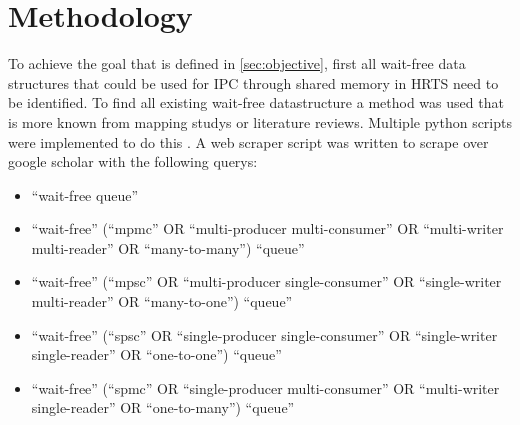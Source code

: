 \chapter{Methodology}\label{ch:methodology}
To achieve the goal that is defined in \cref{sec:objective}, first all wait-free data structures that could be used for \ac{IPC} through shared memory in \ac{HRTS} need to be identified. To find all existing wait-free datastructure a method was used that is more known from mapping studys or literature reviews. Multiple python scripts were implemented to do this \cite{githubMA}. A web scraper script was written to scrape over google scholar with the following querys:
\begin{itemize}
   \item \enquote{wait-free queue}
   \item \enquote{wait-free} (\enquote{mpmc} OR \enquote{multi-producer multi-consumer} OR \enquote{multi-writer multi-reader} OR \enquote{many-to-many}) \enquote{queue}
   \item \enquote{wait-free} (\enquote{mpsc} OR \enquote{multi-producer single-consumer} OR \enquote{single-writer multi-reader} OR \enquote{many-to-one}) \enquote{queue}
   \item \enquote{wait-free} (\enquote{spsc} OR \enquote{single-producer single-consumer} OR \enquote{single-writer single-reader} OR \enquote{one-to-one}) \enquote{queue}
   \item \enquote{wait-free} (\enquote{spmc} OR \enquote{single-producer multi-consumer} OR \enquote{multi-writer single-reader} OR \enquote{one-to-many}) \enquote{queue}
\end{itemize}
